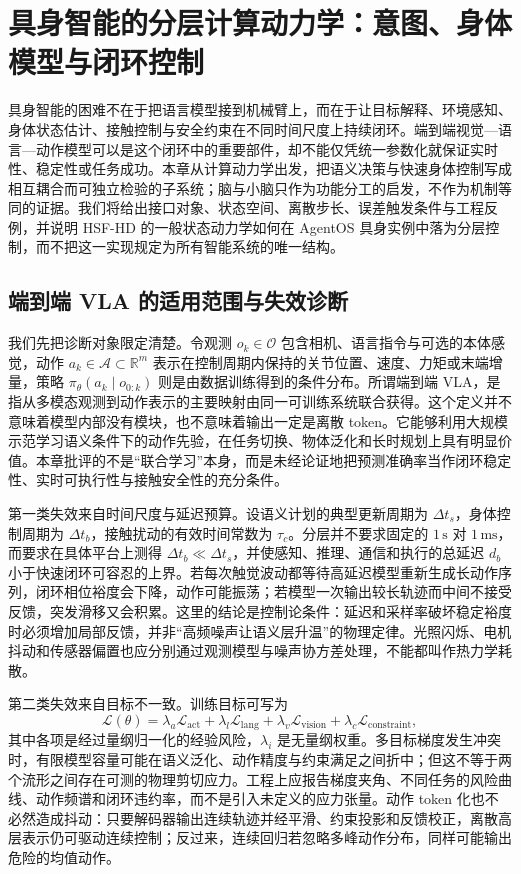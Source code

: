 \chapter{具身智能的分层计算动力学：意图、身体模型与闭环控制}
\label{chp:embodied_intelligence_anatomy}

具身智能的困难不在于把语言模型接到机械臂上，而在于让目标解释、环境感知、身体状态估计、接触控制与安全约束在不同时间尺度上持续闭环。端到端视觉—语言—动作模型可以是这个闭环中的重要部件，却不能仅凭统一参数化就保证实时性、稳定性或任务成功。本章从计算动力学出发，把语义决策与快速身体控制写成相互耦合而可独立检验的子系统；脑与小脑只作为功能分工的启发，不作为机制等同的证据。我们将给出接口对象、状态空间、离散步长、误差触发条件与工程反例，并说明 HSF-HD 的一般状态动力学如何在 AgentOS 具身实例中落为分层控制，而不把这一实现规定为所有智能系统的唯一结构。

\section{端到端 VLA 的适用范围与失效诊断}
\label{sec:vla_pathology}

我们先把诊断对象限定清楚。令观测 $o_k\in\mathcal{O}$ 包含相机、语言指令与可选的本体感觉，动作 $a_k\in\mathcal{A}\subset\mathbb{R}^{m}$ 表示在控制周期内保持的关节位置、速度、力矩或末端增量，策略 $\pi_\theta(a_k\mid o_{0:k})$ 则是由数据训练得到的条件分布。所谓端到端 VLA，是指从多模态观测到动作表示的主要映射由同一可训练系统联合获得。这个定义并不意味着模型内部没有模块，也不意味着输出一定是离散 token。它能够利用大规模示范学习语义条件下的动作先验，在任务切换、物体泛化和长时规划上具有明显价值。本章批评的不是“联合学习”本身，而是未经论证地把预测准确率当作闭环稳定性、实时可执行性与接触安全性的充分条件。

第一类失效来自时间尺度与延迟预算。设语义计划的典型更新周期为 $\Delta t_s$，身体控制周期为 $\Delta t_b$，接触扰动的有效时间常数为 $\tau_c$。分层并不要求固定的 $1\,\mathrm{s}$ 对 $1\,\mathrm{ms}$，而要求在具体平台上测得 $\Delta t_b\ll\Delta t_s$，并使感知、推理、通信和执行的总延迟 $d_b$ 小于快速闭环可容忍的上界。若每次触觉波动都等待高延迟模型重新生成长动作序列，闭环相位裕度会下降，动作可能振荡；若模型一次输出较长轨迹而中间不接受反馈，突发滑移又会积累。这里的结论是控制论条件：延迟和采样率破坏稳定裕度时必须增加局部反馈，并非“高频噪声让语义层升温”的物理定律。光照闪烁、电机抖动和传感器偏置也应分别通过观测模型与噪声协方差处理，不能都叫作热力学耗散。

第二类失效来自目标不一致。训练目标可写为
\begin{equation}
 \mathcal{L}(\theta)=\lambda_a\mathcal{L}_{\mathrm{act}}+\lambda_l\mathcal{L}_{\mathrm{lang}}+\lambda_v\mathcal{L}_{\mathrm{vision}}+\lambda_c\mathcal{L}_{\mathrm{constraint}},
\end{equation}
其中各项是经过量纲归一化的经验风险，$\lambda_i$ 是无量纲权重。多目标梯度发生冲突时，有限模型容量可能在语义泛化、动作精度与约束满足之间折中；但这不等于两个流形之间存在可测的物理剪切应力。工程上应报告梯度夹角、不同任务的风险曲线、动作频谱和闭环违约率，而不是引入未定义的应力张量。动作 token 化也不必然造成抖动：只要解码器输出连续轨迹并经平滑、约束投影和反馈校正，离散高层表示仍可驱动连续控制；反过来，连续回归若忽略多峰动作分布，同样可能输出危险的均值动作。

